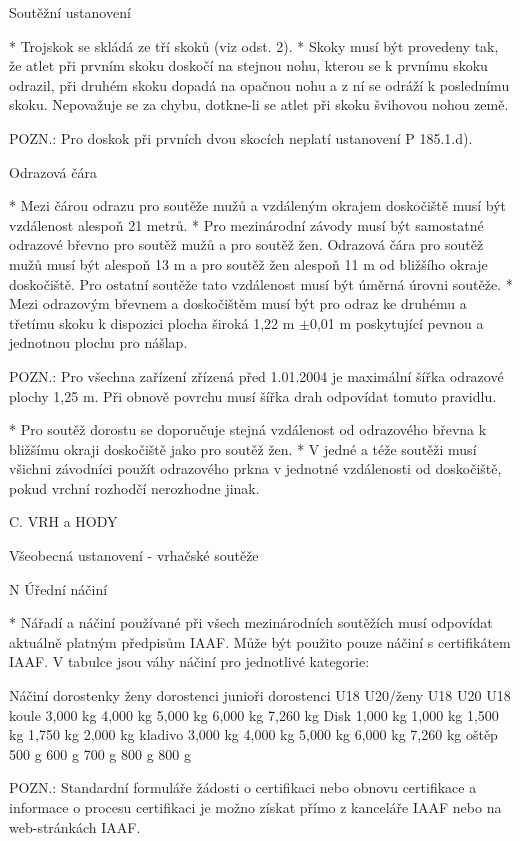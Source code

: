 Soutěžní ustanovení

* Trojskok se skládá ze tří skoků (viz odst. 2).
* Skoky musí být provedeny tak, že atlet při prvním skoku doskočí na stejnou nohu, kterou se k prvnímu skoku odrazil, při druhém skoku dopadá na opačnou nohu a z ní se odráží k poslednímu skoku. Nepovažuje se za chybu, dotkne-li se atlet při skoku švihovou nohou země.

POZN.: Pro doskok při prvních dvou skocích neplatí ustanovení P 185.1.d).

Odrazová čára

* Mezi čárou odrazu pro soutěže mužů a vzdáleným okrajem doskočiště musí být vzdálenost alespoň 21 metrů.
* Pro mezinárodní závody musí být samostatné odrazové břevno pro soutěž mužů a pro soutěž žen.  Odrazová čára pro soutěž mužů musí být alespoň 13 m a pro soutěž žen alespoň 11 m od bližšího okraje doskočiště. Pro ostatní soutěže tato vzdálenost musí být úměrná úrovni soutěže.
* Mezi odrazovým břevnem a doskočištěm musí být pro odraz ke druhému a třetímu skoku k dispozici plocha široká 1,22 m $\pm$0,01 m poskytující pevnou a jednotnou plochu pro nášlap.

POZN.: Pro všechna zařízení zřízená před 1.01.2004 je maximální šířka odrazové plochy 1,25 m. Při obnově povrchu musí šířka drah odpovídat tomuto pravidlu.

* Pro soutěž dorostu se doporučuje stejná vzdálenost od odrazového břevna k bližšímu okraji doskočiště jako pro soutěž žen.
* V jedné a téže soutěži musí všichni závodníci použít odrazového prkna v jednotné vzdálenosti od doskočiště, pokud vrchní rozhodčí nerozhodne jinak.
\enditems


C. VRH a HODY

\secc Všeobecná ustanovení - vrhačské soutěže

\begitems \style N
Úřední náčiní

* Nářadí a náčiní používané při všech mezinárodních soutěžích musí odpovídat aktuálně platným předpisům IAAF. Může být použito pouze náčiní s certifikátem IAAF. V tabulce jsou váhy náčiní pro jednotlivé kategorie:

Náčiní	dorostenky	ženy	dorostenci	junioři	dorostenci
	U18	U20/ženy	U18	U20	U18
koule	3,000 kg	4,000 kg	5,000 kg	6,000 kg	7,260 kg
Disk	1,000 kg	1,000 kg	1,500 kg	1,750 kg	2,000 kg
kladivo	3,000 kg	4,000 kg	5,000 kg	6,000 kg	7,260 kg
oštěp	   500 g	   600 g	   700 g	   800 g	   800 g

POZN.: Standardní  formuláře žádosti o certifikaci nebo obnovu certifikace a informace o procesu certifikaci  je možno získat přímo z kanceláře  IAAF nebo na web-stránkách IAAF.

